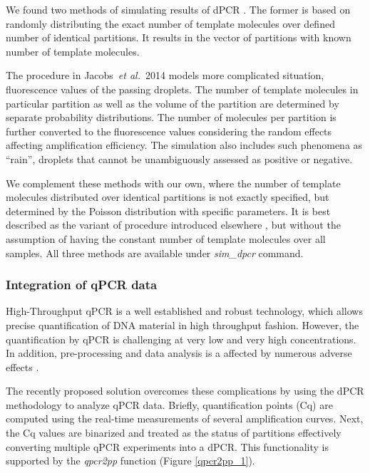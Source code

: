 \documentclass[a4,center,fleqn]{NAR}
\begin{document}
We found two methods of simulating results of dPCR \cite{dube_mathematical_2008, 
jacobs_2014}. The former is based on randomly distributing the exact number 
of template molecules over defined number of identical partitions. It results in 
the vector of partitions with known number of template molecules. 

The procedure in Jacobs~\textit{et al.}~2014 models more complicated situation, 
fluorescence values of the passing droplets. The number of template molecules in 
particular partition as well as the volume of the partition are determined by 
separate probability distributions. The number of molecules per partition is 
further converted to the fluorescence values considering the random effects 
affecting amplification efficiency. The simulation also includes such phenomena 
as ``rain'', droplets that cannot be unambiguously assessed as positive or 
negative.

We complement these methods with our own, where the number of template molecules 
distributed over identical partitions is not exactly specified, but determined 
by the Poisson distribution with specific parameters. It is best described as 
the variant of procedure introduced elsewhere \cite{dube_mathematical_2008}, but 
without the assumption of having the constant number of template molecules over 
all samples. All three methods are available under \textit{sim\_dpcr} 
command.

\subsubsection{Integration of qPCR data}

High-Throughput qPCR is a well established and robust technology, which allows 
precise quantification of DNA material in high throughput fashion. However, the 
quantification by qPCR is challenging at very low and very high concentrations. 
In addition, pre-processing and data analysis is a affected by numerous adverse 
effects \cite{ruijter_2013, spiess_impact_2015}. 

The recently proposed solution \cite{mojtahedi_2014} overcomes these 
complications by using the dPCR methodology to analyze qPCR data. Briefly, 
quantification points (Cq) are computed using the real-time measurements of 
several amplification curves. Next, the Cq values are binarized and treated as 
the status of partitions effectively converting multiple qPCR experiments into a 
dPCR. This functionality is supported by the \textit{qpcr2pp} function (Figure 
\ref{qpcr2pp_1}).
\end{document}
